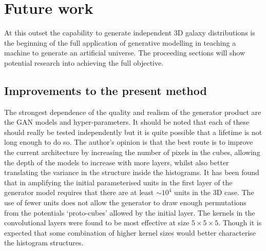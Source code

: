 \documentclass[twocolumn]{article}
\numberwithin{equation}{section}
\begin{document}


\section{Future work}\label{sec:future_work}
At this outset the capability to generate independent 3D galaxy distributions is the beginning of the full application of 
generative modelling in teaching a machine to generate an artificial universe. The proceeding sections will show potential 
research into achieving the full objective.


\subsection{Improvements to the present method}
The strongest dependence of the quality and realism of the generator product are the GAN models and hyper-parameters. It 
should be noted that each of these should really be tested independently but it is quite possible that a lifetime is not 
long enough to do so. The author's opinion is that the best route is to improve the current architecture by increasing the 
number of pixels in the cubes, allowing the depth of the models to increase with more layers, whilst also better translating
the variance in the structure inside the histograms. It has been found that in amplifying the initial parameterised units 
in the first layer of the generator model requires that there are at least $\sim \! 10^4$ units in the 3D case. The use of
fewer units does not allow the generator to draw enough permutations from the potentials  `proto-cubes' allowed by the 
initial layer. The kernels in the convolutional layers were found to be most effective at size $5 \times 5 \times 5$. 
Though it is expected that some combination of higher kernel sizes would better characterise the histogram structures. 
\end{document}
